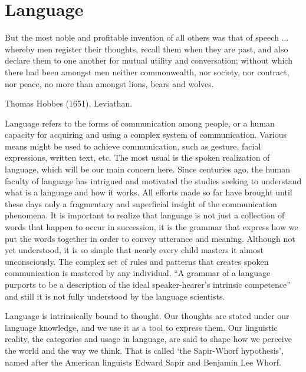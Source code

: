 \chapter{Language}
\epigraph{But the most noble and profitable invention of all others was that of speech ... whereby men register their thoughts, recall them when they are past, and also declare them to one another for mutual utility and conversation; without which there had been amongst men neither commonwealth, nor society, nor contract, nor peace, no more than amongst lions, bears and wolves.}{Thomas Hobbes (1651), Leviathan.}

Language refers to the forms of communication among people, or a human capacity for acquiring and using a complex system
of communication. Various means might be used to achieve communication, such as gesture, facial expressions, written text, etc.
The most usual is the spoken realization of language, which will be our main concern here.
Since centuries ago, the human faculty of language has intrigued and motivated the studies seeking to
understand what is a language and how it works.
All efforts made so far have brought until these days only a fragmentary and superficial 
insight of the communication phenomena. 
It is important to realize that language is not just a collection of words that happen
to occur in succession, it is the grammar that express how we put the words together in
order to convey utterance and meaning. 
Although not yet understood, it is so simple that nearly every child 
masters it almost unconsciously.
The complex set of rules and patterns that creates spoken communication is
mastered by any individual.
``A grammar of a language purports to be a description of the ideal 
speaker-hearer's intrinsic competence'' \citep{chomsky1969}
and still it is not fully understood by the language scientists. 

Language is intrinsically bound to thought. Our thoughts are stated under our language knowledge, 
and we use it as a tool to express them. 
Our linguistic reality, the categories and usage in language, are said to shape how we perceive the world and the way we think. 
That is called `the Sapir-Whorf hypothesis', named after the American linguists Edward Sapir and Benjamin Lee Whorf. 

